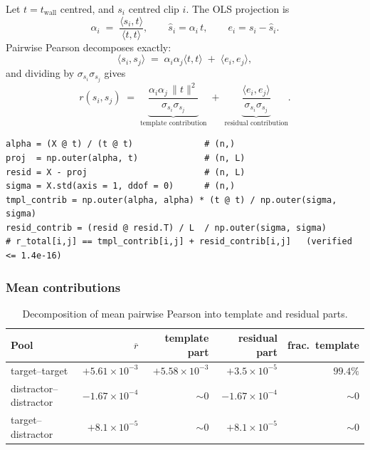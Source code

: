 \documentclass[11pt]{article}
\begin{document}
Let $t = t_{\text{wall}}$ centred, and $s_i$ centred clip $i$.  The
OLS projection is
\begin{equation}
  \alpha_i \;=\; \frac{\langle s_i, t\rangle}{\langle t, t\rangle},
  \qquad
  \hat s_i = \alpha_i\,t,
  \qquad
  e_i = s_i - \hat s_i.
\end{equation}
Pairwise Pearson decomposes exactly:
\begin{equation}
  \langle s_i, s_j\rangle
  \;=\;
  \alpha_i \alpha_j \langle t, t\rangle
  \;+\;
  \langle e_i, e_j\rangle,
\end{equation}
and dividing by $\sigma_{s_i}\sigma_{s_j}$ gives
\begin{equation}
  r(s_i, s_j)
  \;=\;
  \underbrace{\frac{\alpha_i \alpha_j \,\|t\|^2}{\sigma_{s_i}\sigma_{s_j}}}_{\text{template contribution}}
  \;+\;
  \underbrace{\frac{\langle e_i, e_j\rangle}{\sigma_{s_i}\sigma_{s_j}}}_{\text{residual contribution}}.
\end{equation}

\begin{lstlisting}[caption={Decomposition core (\texttt{ch9-projection-residual.py}).}]
alpha = (X @ t) / (t @ t)              # (n,)
proj  = np.outer(alpha, t)             # (n, L)
resid = X - proj                       # (n, L)
sigma = X.std(axis = 1, ddof = 0)      # (n,)
tmpl_contrib = np.outer(alpha, alpha) * (t @ t) / np.outer(sigma, sigma)
resid_contrib = (resid @ resid.T) / L  / np.outer(sigma, sigma)
# r_total[i,j] == tmpl_contrib[i,j] + resid_contrib[i,j]   (verified <= 1.4e-16)
\end{lstlisting}

\subsubsection{Mean contributions}

\begin{table}[H]
\centering
\caption{Decomposition of mean pairwise Pearson into template and residual parts.}
\begin{tabular}{lrrrr}
\toprule
Pool & $\overline{r}$ & template part & residual part & frac.\ template \\
\midrule
target--target          & $+5.61\!\times\!10^{-3}$ & $+5.58\!\times\!10^{-3}$ & $+3.5\!\times\!10^{-5}$ & $99.4\%$ \\
distractor--distractor  & $-1.67\!\times\!10^{-4}$ & $\sim 0$                 & $-1.67\!\times\!10^{-4}$ & $\sim 0$ \\
target--distractor      & $+8.1\!\times\!10^{-5}$  & $\sim 0$                 & $+8.1\!\times\!10^{-5}$  & $\sim 0$ \\
\bottomrule
\end{tabular}
\end{table}
\end{document}
